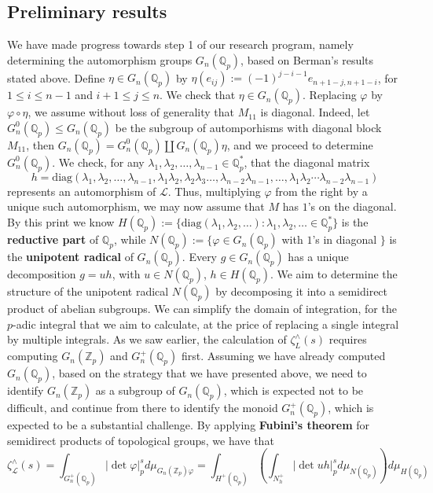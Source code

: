 \documentclass[12pt]{article}
\begin{document}
\subsection{Preliminary results}
\label{preliminary.results}
We have made progress towards step 1 of our research program, namely determining the automorphism groups $G_{n}(\mathbb{Q}_p)$, based on Berman's results stated above.
Define $\eta\in{G_{n}(\mathbb{Q}_p)}$ by $\eta(e_{ij}):=(-1)^{j-i-1}e_{n+1-j,n+1-i}$, for $1\leq{i}\leq{n-1}$ and ${i+1}\leq{j}\leq{n}$. We check that $\eta\in{G_{n}(\mathbb{Q}_{p})}$. Replacing $\varphi$ by $\varphi\circ\eta$, we assume without loss of generality that $M_{11}$ is diagonal. Indeed, let $G_{n}^{0}(\mathbb{Q}_{p})\leq{G_{n}(\mathbb{Q}_{p})}$ be the subgroup of automporhisms with diagonal block $M_{11}$, then $G_{n}(\mathbb{Q}_{p})=G_{n}^{0}(\mathbb{Q}_{p})\coprod{G_{n}(\mathbb{Q}_{p})}\eta$, and we proceed to determine $G_{n}^{0}(\mathbb{Q}_{p})$.
We check, for any $\lambda_{1},\lambda_{2},\dots,\lambda_{n-1}\in\mathbb{Q}_{p}^{\ast}$, that the diagonal matrix \[h=\mathrm{diag}(\lambda_{1},\lambda_{2},\dots,\lambda_{n-1},\lambda_{1}\lambda_{2},\lambda_{2}\lambda_{3}\dots,\lambda_{n-2}\lambda_{n-1},\dots,\lambda_{1}\lambda_{2}\cdots\lambda_{n-2}\lambda_{n-1})\]
represents an automorphism of $\mathcal{L}$. Thus, multiplying $\varphi$ from the right by a unique such automorphism, we may now assume that $M$ has $1$'s on the diagonal. By this print we know
$H(\mathbb{Q}_{p}):=\{\mathrm{diag}(\lambda_{1},\lambda_{2},\dots) : \lambda_{1},\lambda_{2},\dots\in\mathbb{Q}_{p}^{\ast}\}$ is the \textbf{reductive part} of $\mathbb{Q}_{p}$, while $N(\mathbb{Q}_{p}):=\{\varphi\in{G_{n}(\mathbb{Q}_{p})}$ with $1$'s
 in diagonal $\}$ is the \textbf{unipotent radical} of $G_{n}(\mathbb{Q}_{p})$.
Every $g\in{G_{n}(\mathbb{Q}_{p})}$ has a unique decomposition $g=uh$, with $u\in{N}(\mathbb{Q}_{p})$, $h\in{H(\mathbb{Q}_{p})}$. We aim to determine the structure of the unipotent radical $N(\mathbb{Q}_p)$ by decomposing it into a semidirect product of abelian subgroups. 
We can simplify the domain of integration, for the $p$-adic integral that we aim to calculate, at the price of replacing a single integral by multiple integrals. As we saw earlier, the calculation of $\zeta_{L}^{\wedge}(s)$ requires computing $G_{n}(\mathbb{Z}_p)$ and $G_{n}^{+}(\mathbb{Q}_p)$ first. Assuming we have already computed $G_{n}(\mathbb{Q}_p)$, based on the strategy that we have presented above, we need to identify $G_{n}(\mathbb{Z}_p)$ as a subgroup of $G_{n}(\mathbb{Q}_p)$, which is expected not to be difficult, and continue from there to identify the monoid $G_{n}^{+}(\mathbb{Q}_p)$, which is expected to be a substantial challenge. By applying \textbf{Fubini's theorem} for semidirect products of topological groups, we have that \[\zeta_{\mathcal{L}}^{\wedge}(s)=\displaystyle\int_{G_{n}^{+}(\mathbb{Q}_p)}|\det\varphi|_p^sd\mu_{G_{n}(\mathbb{Z}_p)\varphi}=\displaystyle\int_{H^+(\mathbb{Q}_p)}\left(\displaystyle\int_{N_{h}^+}|\det{uh}|_p^sd\mu_{N(\mathbb{Q}_p)}\right)d\mu_{H(\mathbb{Q}_p)}\]
\end{document}
